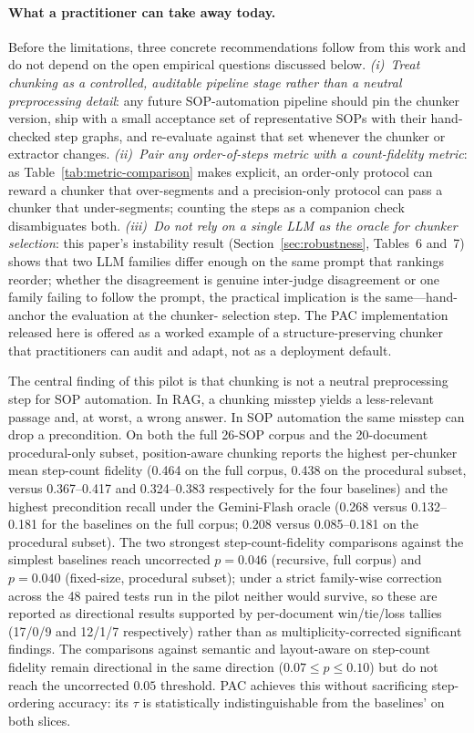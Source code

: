 \documentclass[make,article,submit,oneauthor,pdftex]{Definitions/mdpi}
\begin{document}
\paragraph{What a practitioner can take away today.} Before the
limitations, three concrete recommendations follow from this work and
do not depend on the open empirical questions discussed below.
\emph{(i)~Treat chunking as a controlled, auditable pipeline stage
rather than a neutral preprocessing detail}: any future SOP-automation
pipeline should pin the chunker version, ship with a small acceptance
set of representative SOPs with their hand-checked step graphs, and
re-evaluate against that set whenever the chunker or extractor
changes. \emph{(ii)~Pair any order-of-steps metric with a count-fidelity
metric}: as Table~\ref{tab:metric-comparison} makes explicit, an
order-only protocol can reward a chunker that over-segments and a
precision-only protocol can pass a chunker that under-segments;
counting the steps as a companion check disambiguates both. \emph{(iii)~Do
not rely on a single LLM as the oracle for chunker selection}: this
paper's instability result (Section~\ref{sec:robustness}, Tables~6 and~7)
shows that two LLM families differ enough on the same prompt that
rankings reorder; whether the disagreement is genuine inter-judge
disagreement or one family failing to follow the prompt, the practical
implication is the same---hand-anchor the evaluation at the chunker-
selection step. The PAC implementation released here is offered as a
worked example of a structure-preserving chunker that practitioners
can audit and adapt, not as a deployment default.

The central finding of this pilot is that chunking is not a neutral
preprocessing step for SOP automation. In RAG, a chunking misstep
yields a less-relevant passage and, at worst, a wrong answer. In SOP
automation the same misstep can drop a precondition. On both the
full 26-SOP corpus and the 20-document procedural-only subset,
position-aware chunking reports the highest per-chunker mean
step-count fidelity (0.464 on the full corpus, 0.438 on the
procedural subset, versus 0.367--0.417 and 0.324--0.383 respectively
for the four baselines) and the highest precondition recall under
the Gemini-Flash oracle (0.268 versus 0.132--0.181 for the baselines
on the full corpus; 0.208 versus 0.085--0.181 on the procedural
subset). The two strongest step-count-fidelity comparisons against the
simplest baselines reach uncorrected $p=0.046$ (recursive, full
corpus) and $p=0.040$ (fixed-size, procedural subset); under a strict
family-wise correction across the 48 paired tests run in the pilot
neither would survive, so these are reported as directional results
supported by per-document win/tie/loss tallies (17/0/9 and 12/1/7
respectively) rather than as multiplicity-corrected significant
findings. The comparisons against semantic and layout-aware on
step-count fidelity remain directional in the same direction
($0.07\le p\le0.10$) but do not reach the uncorrected $0.05$ threshold. PAC achieves this without
sacrificing step-ordering accuracy: its $\tau$ is statistically
indistinguishable from the baselines' on both slices.
\end{document}

